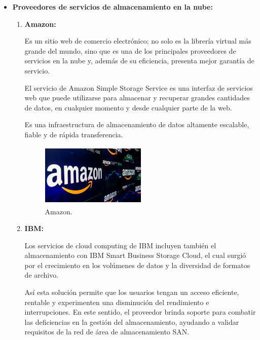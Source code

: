 \documentclass[10pt,journal]{IEEEtran}
\begin{document}
\begin{enumerate}[1.]
    \begin{itemize}
        \item \textbf{Proveedores de servicios de almacenamiento en la nube:}\par
            \begin{enumerate}[]
                \item \textbf{Amazon:} \par
            Es un sitio web de comercio electrónico; no solo es la librería virtual más grande del mundo, sino que es una de los principales proveedores de servicios en la nube y, además de su eficiencia, presenta mejor garantía de servicio.\par El servicio de Amazon Simple Storage Service es una interfaz de servicios web que puede utilizarse para almacenar y recuperar grandes cantidades de datos, en cualquier momento y desde cualquier parte de la web.\par Es una infraestructura de almacenamiento de datos altamente escalable, fiable y de rápida transferencia.
            \begin{figure}[H]
                \begin{center}
                \includegraphics[width=5cm, height=3cm]{figuras/amazon.jpg}
                \caption{Amazon.}
                \label{f12} 
                \end{center}
            \end{figure}
            \item\textbf{IBM:} \par
            Los servicios de cloud computing de IBM incluyen también el almacenamiento con IBM Smart Business Storage Cloud, el cual surgió por el crecimiento en los volúmenes de datos y la diversidad de formatos de archivo. \par Así esta solución permite que los usuarios tengan un acceso eficiente, rentable y experimenten una disminución del rendimiento e interrupciones. En este sentido, el proveedor brinda soporte para combatir las deficiencias en la  gestión  del  almacenamiento,  ayudando  a  validar  requisitos  de la  red  de  área  de almacenamiento SAN.
            \begin{figure}[H]

\end{figure}
\end{enumerate}
\end{itemize}
\end{enumerate}
\end{document}
